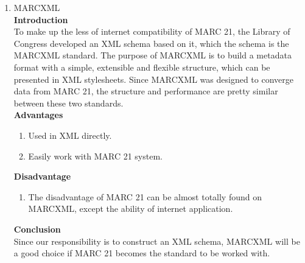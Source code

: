 \begin{enumerate}
	{\bf Conclusion}\\
	The MARC formats 21 are still used and disseminated for the exchange of cataloging data in digital environment. 
	Despite the advantages offered by the coding XML, including the development of software for processing MARC 21 records still persists.\\
	Together with efforts to use XML - coding in MARC21 records, LC is designed meta data standards which have alternatives to traditional formats. 
	Among these standards are the Metadata Object Description Schema (MODS) (Metadata Scheme for description of object) and the Metadata Authority Description Schema (MADS), 
	both created for use with XML and specified by XML schemta.\\
	The MODS and MADS have great compatibility with the traditional formats of MARC 21, although in general do not allow the data record with the same level of specificity given by the MARC formats 21.\\
	The MODS, due to the high compatibility with the MARC format 21 for Bibliographic Data can be chosen by libraries as a metadata standard for describing information resources.

	\item MARCXML\\
	{\bf Introduction}\\
	To make up the less of internet compatibility of MARC 21, the Library of Congress developed an XML schema based on it, which the schema is the MARCXML standard. 
	The purpose of MARCXML is to build a metadata format with a simple, extensible and flexible structure, which can be presented in XML stylesheets. 
	Since MARCXML was designed to converge data from MARC 21, the structure and performance are pretty similar between these two standards.\\
	
	{\bf Advantages}
	\begin{enumerate}
		\item Used in XML directly.
		\item Easily work with MARC 21 system.
	\end{enumerate}	
	{\bf Disadvantage}
	\begin{enumerate}
		\item The disadvantage of MARC 21 can be almost totally found on MARCXML, except the ability of internet application.
	\end{enumerate}
	{\bf Conclusion}\\
	Since our responsibility is to construct an XML schema, MARCXML will be a good choice if MARC 21 becomes the standard to be worked with.
	

\end{enumerate}
